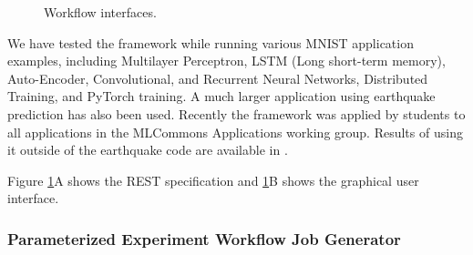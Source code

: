 \begin{figure}[htb]


  

    \caption{Workflow interfaces.}
    \label{fig:cc-3}
\end{figure}


We have tested the framework while running various MNIST application examples, including Multilayer Perceptron, LSTM (Long short-term memory), Auto-Encoder, Convolutional, and Recurrent Neural Networks, Distributed Training, and PyTorch training.  A much larger application using earthquake prediction has also been used.
Recently the framework was applied by students to all applications in the MLCommons Applications working group. Results of using it outside of the earthquake code are available in \cite{las-2023-escience}.

Figure \ref{fig:cc-3}A shows the REST specification and \ref{fig:cc-3}B shows the graphical user interface.

\subsubsection{Parameterized Experiment Workflow Job Generator}
\label{sec:workflow-ee}

